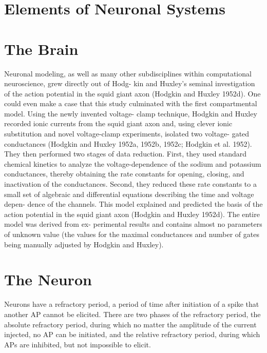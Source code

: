 \section{Elements of Neuronal Systems}

\section{The Brain}

Neuronal modeling, as well as many other subdisciplines within computational neuroscience, grew directly out of Hodg- kin and Huxley’s seminal investigation of the action potential in the squid giant axon (Hodgkin and Huxley 1952d). One could even make a case that this study culminated with the first compartmental model. Using the newly invented voltage- clamp technique, Hodgkin and Huxley recorded ionic currents from the squid giant axon and, using clever ionic substitution and novel voltage-clamp experiments, isolated two voltage- gated conductances (Hodgkin and Huxley 1952a, 1952b, 1952c; Hodgkin et al. 1952). They then performed two stages of data reduction. First, they used standard chemical kinetics to analyze the voltage-dependence of the sodium and potassium conductances, thereby obtaining the rate constants for opening, closing, and inactivation of the conductances. Second, they reduced these rate constants to a small set of algebraic and differential equations describing the time and voltage depen- dence of the channels. This model explained and predicted the basis of the action potential in the squid giant axon (Hodgkin and Huxley 1952d). The entire model was derived from ex- perimental results and contains almost no parameters of unknown value (the values for the maximal conductances and number of gates being manually adjusted by Hodgkin and Huxley).

\section{The Neuron}

Neurons have a refractory period, a period of time after initiation of a spike that another AP cannot be elicited. There are two phases of the refractory period, the absolute refractory period, during which no matter the amplitude of the current injected, no AP can be initiated, and the relative refractory period, during which APs are inhibited, but not impossible to elicit.

